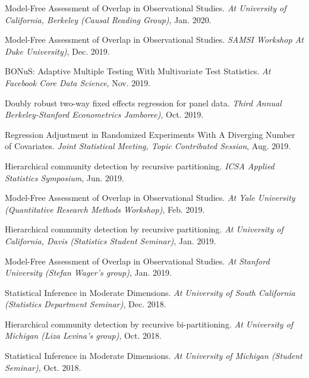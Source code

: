 \documentclass{article}
\begin{document}
\vspace{2mm}
Model-Free Assessment of Overlap in Observational Studies. \emph{At University of California, Berkeley (Causal Reading Group)}, Jan. 2020.

\vspace{2mm}
Model-Free Assessment of Overlap in Observational Studies. \emph{SAMSI Workshop At Duke University)}, Dec. 2019.

\vspace{2mm}
BONuS: Adaptive Multiple Testing With Multivariate Test Statistics. \emph{At Facebook Core Data Science}, Nov. 2019.

\vspace{2mm}
Doubly robust two-way fixed effects regression for panel data. \emph{Third Annual Berkeley-Stanford Econometrics Jamboree)}, Oct. 2019.

\vspace{2mm}
Regression Adjustment in Randomized Experiments With A Diverging Number of Covariates. \emph{Joint Statistical Meeting, Topic Contributed Session}, Aug. 2019.

\vspace{2mm}
Hierarchical community detection by recursive partitioning. \emph{ICSA Applied Statistics Symposium}, Jun. 2019.

\vspace{2mm}
Model-Free Assessment of Overlap in Observational Studies. \emph{At Yale University (Quantitative Research Methods Workshop)}, Feb. 2019.

\vspace{2mm}
Hierarchical community detection by recursive partitioning. \emph{At University of California, Davis (Statistics Student Seminar)}, Jan. 2019.

\vspace{2mm}
Model-Free Assessment of Overlap in Observational Studies. \emph{At Stanford University (Stefan Wager's group)}, Jan. 2019.

\vspace{2mm}
Statistical Inference in Moderate Dimensions. \emph{At University of South California (Statistics Department Seminar)}, Dec. 2018.

\vspace{2mm}
Hierarchical community detection by recursive bi-partitioning. \emph{At University of Michigan (Liza Levina's group)}, Oct. 2018.

\vspace{2mm}
Statistical Inference in Moderate Dimensions. \emph{At University of Michigan (Student Seminar)}, Oct. 2018.
\end{document}

